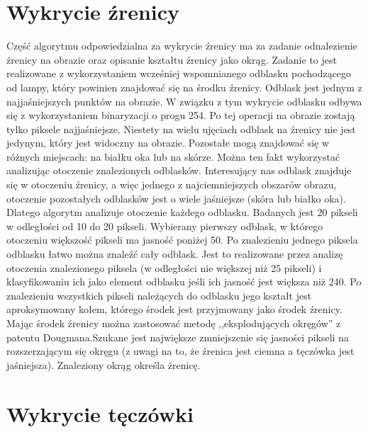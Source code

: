 \section{Wykrycie źrenicy}
\label{sec:wykrycieZrenicy}
Część algorytmu odpowiedzialna za wykrycie źrenicy ma za zadanie odnalezienie źrenicy na obrazie oraz opisanie kształtu źrenicy jako okrąg. Zadanie to jest realizowane z wykorzystaniem wcześniej wspomnianego odblasku pochodzącego od lampy, który powinien znajdować się na środku źrenicy. Odblask jest jednym z najjaśniejszych punktów na obrazie. W związku z tym wykrycie odblasku odbywa się z wykorzystaniem binaryzacji o progu 254. Po tej operacji na obrazie zostają tylko piksele najjaśniejsze. Niestety na wielu ujęciach odblask na źrenicy nie jest jedynym, który jest widoczny na obrazie. Pozostałe mogą znajdować się w różnych miejscach: na białku oka lub na skórze. Można ten fakt wykorzystać analizując otoczenie znalezionych odblasków. Interesujący nas odblask znajduje się w otoczeniu źrenicy, a więc jednego z najciemniejszych obszarów obrazu, otoczenie pozostałych odblasków jest o wiele jaśniejsze (skóra lub białko oka). Dlatego algorytm analizuje otoczenie każdego odblasku. Badanych jest 20 pikseli w odległości od 10 do 20 pikseli. Wybierany pierwszy odblask, w którego otoczeniu większość pikseli ma jasność poniżej 50. Po znalezieniu jednego piksela odblasku łatwo można znaleźć cały odblask. Jest to realizowane przez analizę otoczenia znalezionego piksela (w odległości nie większej niż 25 pikseli) i klasyfikowaniu ich jako element odblasku jeśli ich jasność jest większa niż 240. Po znalezieniu wszystkich pikseli należących do odblasku jego kształt jest aproksymowany kołem, którego środek jest przyjmowany jako środek źrenicy. Mając środek źrenicy można zastosować metodę ,,eksplodujących okręgów'' z patentu Dougmana.Szukane jest największe zmniejszenie się jasności pikseli na rozszerzającym się okręgu (z uwagi na to, że źrenica jest ciemna a tęczówka jest jaśniejsza). Znaleziony okrąg określa źrenicę.

\section{Wykrycie tęczówki}
\label{sec:wykrycieTeczowki}
